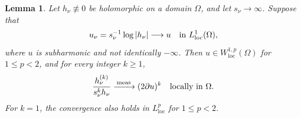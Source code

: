 \documentclass[11pt,letterpaper,reqno]{amsart}
\newtheorem{lem}[thm]{Lemma}
\theoremstyle{remark}
\numberwithin{equation}{section}
\newcommand{\loc}{\mathrm{loc}}
\newcommand{\convmeas}{\xrightarrow{\,\mathrm{meas}\,}}
\begin{document}
\begin{lem}\label{lem:logderivlimit}
Let $h_\nu\not\equiv0$ be holomorphic on a domain $\Omega$, and let
$s_\nu\to\infty$. Suppose that
\begin{equation}\label{eq:log-limit-assumption}
 u_\nu=s_\nu^{-1}\log|h_\nu|\longrightarrow u
 \quad\hbox{in }L^1_{\loc}(\Omega),
\end{equation}
where $u$ is subharmonic and not identically $-\infty$. Then
$u\in W^{1,p}_{\loc}(\Omega)$ for $1\le p<2$, and for every integer $k\ge1$,
\begin{equation}\label{eq:logderivlimit}
 \frac{h_\nu^{(k)}}{s_\nu^kh_\nu}
 \convmeas(2\partial u)^k
 \quad\hbox{locally in }\Omega.
\end{equation}
For $k=1$, the convergence also holds in $L^p_{\loc}$ for $1\le p<2$.
\end{lem}
\end{document}

